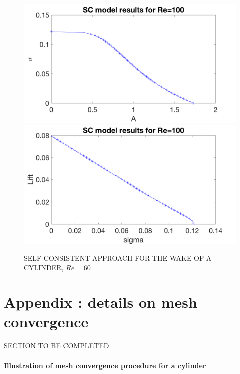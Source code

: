 \documentclass[twocolumn,10pt]{asme2ej}
\begin{document}
\begin{figure}
\begin{center}
\includegraphics[width=.9 \linewidth]{Cylinder_SC100_EnergySigma.png}
\includegraphics[width=.9 \linewidth]{Cylinder_SC100_LiftSigma.png}
\end{center}
\caption{SELF CONSISTENT APPROACH FOR THE WAKE OF A CYLINDER, $Re = 60$}
\label{fig:SC60}
\end{figure}






\appendix

\section{Appendix : details on mesh convergence}

SECTION TO BE COMPLETED

\paragraph{Illustration of mesh convergence procedure for a cylinder}
\end{document}
